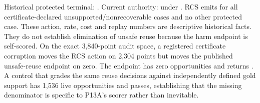 \markdownRendererDocumentBegin
\markdownRendererSectionBegin
{}\markdownRendererInterblockSeparator
{}Historical protected terminal: . Current authority:  under .\markdownRendererInterblockSeparator
{}\markdownRendererInterblockSeparator
{}RCS emits  for all  certificate-declared unsupported/nonrecoverable cases and no other protected case. These action, rate, cost and replay numbers are descriptive historical facts. They do not establish elimination of unsafe reuse because the harm endpoint is self-scored.\markdownRendererInterblockSeparator
{}\markdownRendererSectionBegin
{}\markdownRendererInterblockSeparator
{}On the exact 3,840-point audit space, a registered certificate corruption moves the RCS action on 2,304 points but moves the published unsafe-reuse endpoint on zero. The endpoint has zero opportunities and returns . A control that grades the same reuse decisions against independently defined gold support has 1,536 live opportunities and passes, establishing that the missing denominator is specific to P13A's scorer rather than inevitable.\markdownRendererInterblockSeparator
{}
\markdownRendererSectionEnd \markdownRendererSectionBegin
{}\markdownRendererInterblockSeparator
